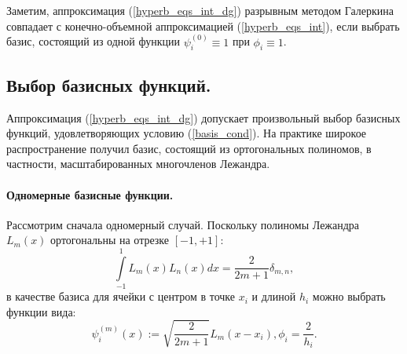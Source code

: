 \documentclass[14pt, a4paper, fleqn]{extreport}
\begin{document}
	
	Заметим, аппроксимация (\ref{hyperb_eqs_int_dg}) разрывным методом Галеркина
	совпадает с конечно-объемной аппроксимацией (\ref{hyperb_eqs_int}), если выбрать базис, 
	состоящий из одной функции $\psi_i^{(0)} \equiv 1$ при $\phi_i \equiv 1$.
	 
	\subsection{Выбор базисных функций.}
	
	Аппроксимация (\ref{hyperb_eqs_int_dg}) допускает
	произвольный выбор базисных функций, удовлетворяющих условию (\ref{basis_cond}).
	На практике широкое распространение получил базис, состоящий из ортогональных полиномов,
	в частности, масштабированных многочленов Лежандра.
		
	\paragraph{Одномерные базисные функции.}
	Рассмотрим сначала одномерный случай.
	Поскольку полиномы Лежандра $L_m(x)$ ортогональны на отрезке $[-1, +1]$:
	\begin{equation*}
		\int\limits_{-1}^1 L_m(x) L_n(x) dx = \dfrac{2}{2m + 1}\delta_{m,n},
	\end{equation*}
	в качестве базиса для ячейки с центром в точке $x_i$ и длиной $h_i$ можно выбрать функции
	вида:
	\begin{equation*}
	\boxed{
		\psi_i^{(m)}(x) := \sqrt{\dfrac{2}{2m+1}} L_m(x - x_i), \phi_i = \dfrac{2}{h_i}.
	}
	\end{equation*}
	
\end{document}
